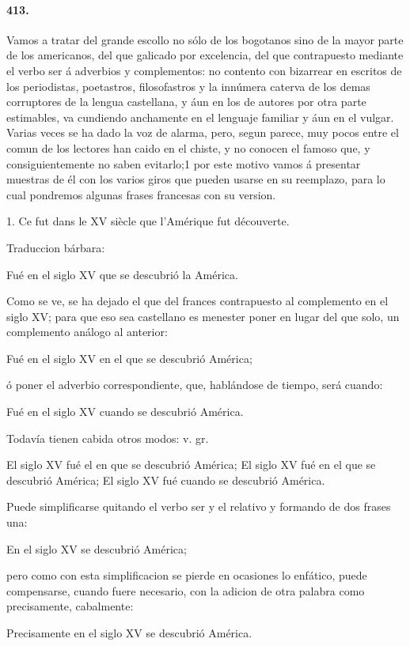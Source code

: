 \documentclass{book}
\begin{document}
\paragraph{413.} Vamos a tratar del grande escollo no sólo de los bogotanos sino de la mayor 
parte de los americanos, del que galicado por excelencia, del que contrapuesto mediante el 
verbo ser á adverbios y complementos: no contento con bizarrear en escritos de los periodistas, 
poetastros, filosofastros y la innúmera caterva de los demas corruptores de la lengua 
castellana, y áun en los de autores por otra parte estimables, va cundiendo anchamente en el 
lenguaje familiar y áun en el vulgar. Varias veces se ha dado la voz de alarma, pero, segun 
parece, muy pocos entre el comun de los lectores han caido en el chiste, y no conocen el famoso 
que, y consiguientemente no saben evitarlo;1 por este motivo vamos á presentar muestras de él 
con los varios giros que pueden usarse en su reemplazo, para lo cual pondremos algunas frases 
francesas con su version.

1. Ce fut dans le XV siècle que l'Amérique fut découverte.

Traduccion bárbara:

Fué en el siglo XV que se descubrió la América.

Como se ve, se ha dejado el que del frances contrapuesto al complemento en el siglo XV; para 
que eso sea castellano es menester poner en lugar del que solo, un complemento análogo al 
anterior:

Fué en el siglo XV en el que se descubrió América;

ó poner el adverbio correspondiente, que, hablándose de tiempo, será cuando:

Fué en el siglo XV cuando se descubrió América.

Todavía tienen cabida otros modos: v. gr.

El siglo XV  fué  el en que se descubrió América;
El siglo XV  fué  en el que se descubrió América;
El siglo XV  fué  cuando se descubrió América.

Puede simplificarse quitando el verbo ser y el relativo y formando de dos frases una:

En el siglo XV se descubrió América;

pero como con esta simplificacion se pierde en ocasiones lo enfático, puede compensarse, cuando 
fuere necesario, con la adicion de otra palabra como precisamente, cabalmente:

Precisamente en el siglo XV se descubrió América.
\end{document}
